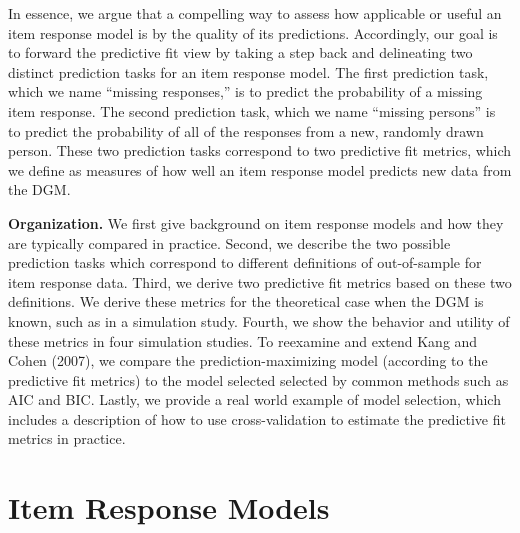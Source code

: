 \documentclass[
  english,
  man,floatsintext]{apa7}
\begin{document}
In essence, we argue that a compelling way to assess how applicable or useful an item response model is by the quality of its predictions. Accordingly, our goal is to forward the predictive fit view by taking a step back and delineating two distinct prediction tasks for an item response model. The first prediction task, which we name ``missing responses,'' is to predict the probability of a missing item response. The second prediction task, which we name ``missing persons'' is to predict the probability of all of the responses from a new, randomly drawn person. These two prediction tasks correspond to two predictive fit metrics, which we define as measures of how well an item response model predicts new data from the DGM.

\textbf{Organization.} We first give background on item response models and how they are typically compared in practice. Second, we describe the two possible prediction tasks which correspond to different definitions of out-of-sample for item response data. Third, we derive two predictive fit metrics based on these two definitions. We derive these metrics for the theoretical case when the DGM is known, such as in a simulation study. Fourth, we show the behavior and utility of these metrics in four simulation studies. To reexamine and extend Kang and Cohen (2007), we compare the prediction-maximizing model (according to the predictive fit metrics) to the model selected selected by common methods such as AIC and BIC. Lastly, we provide a real world example of model selection, which includes a description of how to use cross-validation to estimate the predictive fit metrics in practice.

\hypertarget{item-response-models}{%
\section{Item Response Models}\label{item-response-models}}
\end{document}
